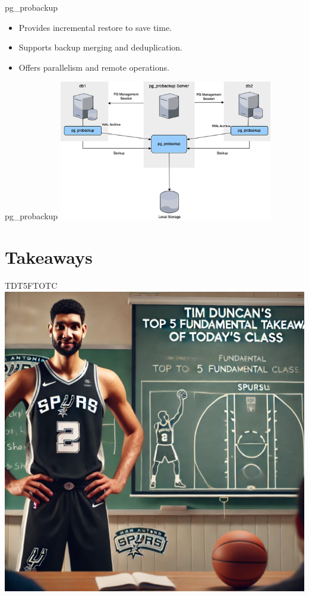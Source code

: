 \documentclass[aspectratio=169]{beamer}
\begin{document}
\begin{frame}{pg\_probackup}
    \begin{itemize}
        \item Provides incremental restore to save time.
        \item Supports backup merging and deduplication.
        \item Offers parallelism and remote operations.
    \end{itemize}
\end{frame}

\begin{frame}{pg\_probackup}
    \centering
    \includegraphics[width=0.7\textwidth]{figures/pg_probackup}
\end{frame}

\section*{Takeaways}

\begin{frame}{TDT5FTOTC}
    \centering
    \includegraphics[height=0.9\textheight]{figures/tim.png}
\end{frame}
\end{document}
